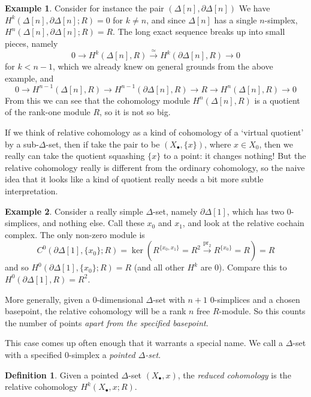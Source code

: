 \documentclass{tufte-handout}
\DeclareMathOperator{\pr}{pr}
\DeclareMathOperator{\sk}{sk}
\theoremstyle{definition}
\newtheorem{definition}{Definition}
\newtheorem{example}{Example}
\begin{document}
\begin{example}
Consider for instance the pair $(\Delta[n],\partial\Delta[n])$\marginnote{A special case of 
Example~\ref{eg:dim_minus_one_skeleton_rel_cochains}, as $\partial\Delta[n] = 
\sk_{n-1}\Delta[n]$} We have $H^k(\Delta[n],\partial\Delta[n];R) = 0$ for $k\neq n$, and since 
$\Delta[n]$ has a single $n$-simplex, $H^n(\Delta[n],\partial\Delta[n];R)=R$. The long exact 
sequence breaks up into small pieces, namely
\[
	0\to H^k(\Delta[n],R) \xrightarrow{\simeq} H^k(\partial\Delta[n],R) \to 0
\]
for $k<n-1$, which we already knew on general grounds from the above example, and
\[
0\to H^{n-1}(\Delta[n],R) \to H^{n-1}(\partial\Delta[n],R) \to R \to 
H^n(\Delta[n],R) \to 0
\]
From this we can see that the cohomology module $H^n(\Delta[n],R)$ is a quotient of the rank-one module $R$, so it is not so big.
\end{example}

If we think of relative cohomology as a kind of cohomology of a `virtual quotient' by a sub-$\Delta$-set,
then if take the pair to be $(X_\bullet,\{x\})$, where $x\in X_0$, then we really can take the quotient squashing $\{x\}$ to a point: it changes nothing!
But the relative cohomology really is different from the ordinary cohomology, so the naive idea that it
looks like a kind of quotient really needs a bit more subtle interpretation.

\begin{example}
Consider a really simple $\Delta$-set, namely $\partial\Delta[1]$, which has two $0$-simplices, and
nothing else. Call these $x_0$ and $x_1$, and look at the relative cochain complex. The only non-zero
module is
\[
C^0(\partial\Delta[1],\{x_0\};R) = \ker(R^{\{x_0,x_1\}} = R^2\xrightarrow{\pr_2} R^{\{x_0\}} = R) = R
\]
and so $H^0(\partial\Delta[1],\{x_0\};R) = R$ (and all other $H^k$ are $0$). Compare this to 
$H^0(\partial\Delta[1],R) = R^2$.
\end{example}

More generally, given a $0$-dimensional $\Delta$-set with $n+1$ $0$-simplices and a chosen 
basepoint, the relative cohomology will be a rank $n$ free $R$-module. So this counts the number 
of points \emph{apart from the specified basepoint}. 

This case comes up often enough that it warrants a special name. We call a $\Delta$-set with a specified
$0$-simplex a \emph{pointed $\Delta$-set}.

\begin{definition}
Given a pointed $\Delta$-set $(X_\bullet,x)$, the \emph{reduced cohomology} is the 
relative cohomology $H^k(X_\bullet,x;R)$.
\end{definition}
\end{document}
